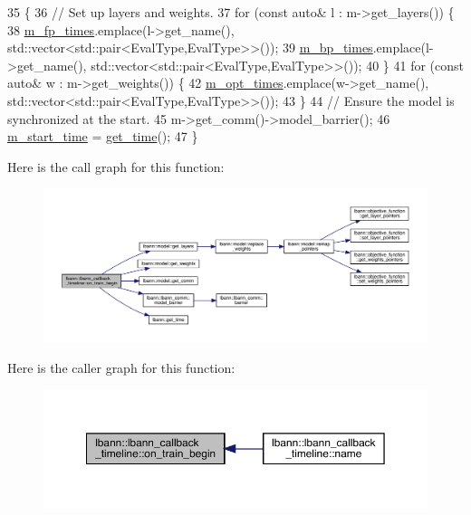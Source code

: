 \begin{DoxyCode}
35                                                      \{
36   \textcolor{comment}{// Set up layers and weights.}
37   \textcolor{keywordflow}{for} (\textcolor{keyword}{const} \textcolor{keyword}{auto}& l : m->get\_layers()) \{
38     \hyperlink{classlbann_1_1lbann__callback__timeline_ab43061b16cd5d29045be1d9294a80ef1}{m\_fp\_times}.emplace(l->get\_name(), std::vector<std::pair<EvalType,EvalType>>());
39     \hyperlink{classlbann_1_1lbann__callback__timeline_a59e63a11f33ed0cf3fd40dd2d8f91ede}{m\_bp\_times}.emplace(l->get\_name(), std::vector<std::pair<EvalType,EvalType>>());
40   \}
41   \textcolor{keywordflow}{for} (\textcolor{keyword}{const} \textcolor{keyword}{auto}& w : m->get\_weights()) \{
42     \hyperlink{classlbann_1_1lbann__callback__timeline_abc57215e52823fe6f44f040f06f60847}{m\_opt\_times}.emplace(w->get\_name(), std::vector<std::pair<EvalType,EvalType>>());
43   \}
44   \textcolor{comment}{// Ensure the model is synchronized at the start.}
45   m->get\_comm()->model\_barrier();
46   \hyperlink{classlbann_1_1lbann__callback__timeline_a624a9b00735fb7644d544ec6ed83dd27}{m\_start\_time} = \hyperlink{namespacelbann_a478d36031ff0659893c4322cd856157f}{get\_time}();
47 \}
\end{DoxyCode}
Here is the call graph for this function\+:\nopagebreak
\begin{figure}[H]
\begin{center}
\leavevmode
\includegraphics[width=350pt]{classlbann_1_1lbann__callback__timeline_a35a431c2545b4087d6f970d45f86c054_cgraph}
\end{center}
\end{figure}
Here is the caller graph for this function\+:\nopagebreak
\begin{figure}[H]
\begin{center}
\leavevmode
\includegraphics[width=350pt]{classlbann_1_1lbann__callback__timeline_a35a431c2545b4087d6f970d45f86c054_icgraph}
\end{center}
\end{figure}
